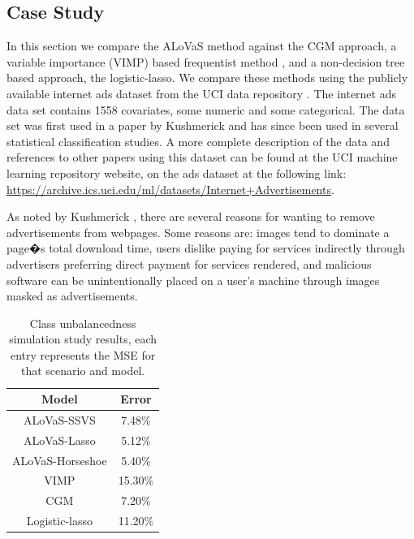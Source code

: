 \subsection{Case Study}\label{sec:real_data}

In this section we compare the ALoVaS method against the CGM approach, a variable importance (VIMP) based frequentist method \cite{ishwaran2010high}, and a non-decision tree based approach, the logistic-lasso. We compare these methods using the publicly available internet ads dataset from the UCI data repository \cite{Frank:2010uq}. The internet ads data set contains 1558 covariates, some numeric and some categorical. The data set was first used in a paper by Kushmerick \cite{kushmerick1999learning} and has since been used in several statistical classification studies. A more complete description of the data and references to other papers using this dataset can be found at the UCI machine learning repository website, on the ads dataset at the following link: \url{https://archive.ics.uci.edu/ml/datasets/Internet+Advertisements}.

As noted by Kushmerick \cite{kushmerick1999learning}, there are several reasons for wanting to remove advertisements from webpages. Some reasons are: images tend to dominate a page�s total download time, users dislike paying for services indirectly through advertisers preferring direct payment for services rendered, and malicious software can be unintentionally placed on a user's machine through images masked as advertisements. 

		\begin{table}[H]
\begin{center}
\begin{tabular}{|c|c|} \hline
Model & Error \\ \hline
ALoVaS-SSVS&7.48\%\\ \hline
ALoVaS-Lasso &5.12\% \\ \hline
ALoVaS-Horseshoe&5.40\% \\ \hline
VIMP& 15.30\%\\ \hline
CGM&7.20\%\\ \hline
Logistic-lasso&11.20\%\\ \hline
\end{tabular}
\caption{Class unbalancedness simulation study results, each entry represents the MSE for that scenario and model. }
\label{tab:ads_misclass}
\end{center}
\end{table}

